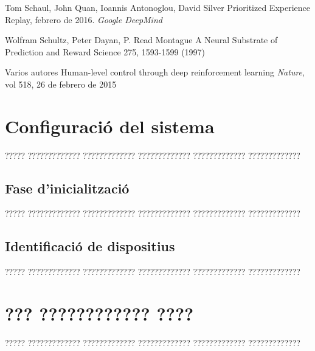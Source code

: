 \documentclass[11pt,spanish,listoffigures,listoftables]{tfgetsinf}
\begin{document}
\begin{thebibliography}{10}
	Tom Schaul, John Quan, Ioannis Antonoglou, David Silver
	\newblock Prioritized Experience Replay,
	febrero de 2016.
	\newblock \textit {Google DeepMind}
	
	 Wolfram Schultz, Peter Dayan, P. Read Montague
	 \newblock A Neural Substrate of Prediction and Reward
	 Science 275, 1593-1599 (1997)
	 
	Varios autores
	\newblock Human-level control through deep reinforcement learning
	\newblock \textit{Nature}, vol 518, 26 de febrero de 2015
	


\end{thebibliography}
\cleardoublepage


\APPENDIX


\chapter{Configuració del sistema}

????? ????????????? ????????????? ????????????? ????????????? ?????????????

\section{Fase d'inicialització}

????? ????????????? ????????????? ????????????? ????????????? ?????????????

\section{Identificació de dispositius}

????? ????????????? ????????????? ????????????? ????????????? ?????????????



\chapter{??? ???????????? ????}

????? ????????????? ????????????? ????????????? ????????????? ????????????? 



\end{document}

